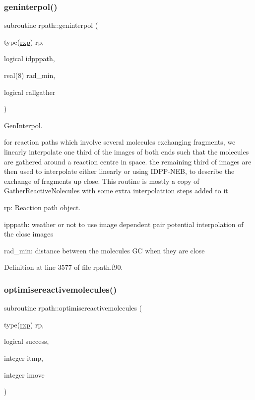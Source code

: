 \subsubsection{\texorpdfstring{geninterpol()}{geninterpol()}}
{\footnotesize\ttfamily subroutine rpath\+::geninterpol (\begin{DoxyParamCaption}\item[{type(\mbox{\hyperlink{structrpath_1_1rxp}{rxp}})}]{rp,  }\item[{logical}]{idpppath,  }\item[{real(8)}]{rad\+\_\+min,  }\item[{logical}]{callgather }\end{DoxyParamCaption})}



Gen\+Interpol. 

for reaction paths which involve several molecules exchanging fragments, we linearly interpolate one third of the images of both ends such that the molecules are gathered around a reaction centre in space. the remaining third of images are then used to interpolate either linearly or using I\+D\+P\+P-\/\+N\+EB, to describe the exchange of fragments up close. This routine is mostly a copy of Gather\+Reactive\+Nolecules with some extra interpolattion steps added to it


\begin{DoxyItemize}
\item rp\+: Reaction path object.
\item ipppath\+: weather or not to use image dependent pair potential interpolation of the close images
\item rad\+\_\+min\+: distance between the molecules GC when they are close 
\end{DoxyItemize}

Definition at line 3577 of file rpath.\+f90.

\mbox{\label{namespacerpath_a2e9f77deb07ac9c56b2068eaf7853a4a}} 
\subsubsection{\texorpdfstring{optimisereactivemolecules()}{optimisereactivemolecules()}}
{\footnotesize\ttfamily subroutine rpath\+::optimisereactivemolecules (\begin{DoxyParamCaption}\item[{type(\mbox{\hyperlink{structrpath_1_1rxp}{rxp}})}]{rp,  }\item[{logical}]{success,  }\item[{integer}]{itmp,  }\item[{integer}]{imove }\end{DoxyParamCaption})}



